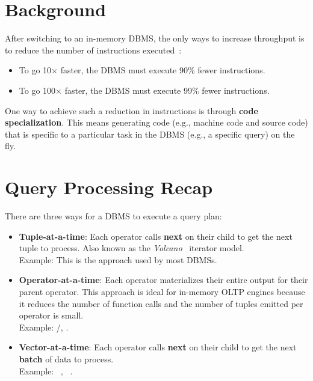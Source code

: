 \documentclass[11pt]{article}
\begin{document}
\maketitle
\thispagestyle{plain}

\section{Background}
After switching to an in-memory DBMS, the only ways to increase throughput is to reduce the number 
of instructions executed~\cite{freedman2014}:
\begin{itemize}
    \item
    To go 10$\times$ faster, the DBMS must execute 90\% fewer instructions.
    
    \item
    To go 100$\times$ faster, the DBMS must execute 99\% fewer instructions.
\end{itemize}
    
One way to achieve such a reduction in instructions is through \textbf{code specialization}. This 
means generating code (e.g., machine code and source code) that is specific to a particular task in 
the DBMS (e.g., a specific query) on the fly.

\section{Query Processing Recap}
There are three ways for a DBMS to execute a query plan:
\begin{itemize}
    \item \textbf{Tuple-at-a-time}:
    Each operator calls \textbf{next} on their child to get the next tuple to process. 
    Also known as the \textit{Volcano}~\cite{graefe1994} iterator model. \\
    Example: This is the approach used by most DBMSs.
    
    \item \textbf{Operator-at-a-time}:
    Each operator materializes their entire output for their parent operator.
    This approach is ideal for in-memory OLTP engines because it reduces the number of function 
    calls and the number of tuples emitted per operator is small. \\
    Example: /, .
    
    \item \textbf{Vector-at-a-time}:
    Each operator calls \textbf{next} on their child to get the next \textbf{batch} of data to 
    process. \\
    Example: ~\cite{bonc2005}, ~\cite{menon2017}.
\end{itemize}
    
\end{document}
